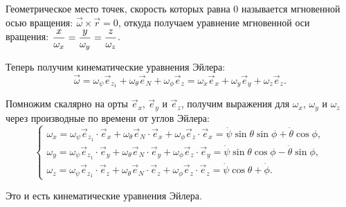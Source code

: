 Геометрическое место точек, скорость которых равна 0 называется мгновенной осью
вращения: \( \vec{\omega}\times\vec{r} = 0 \), откуда получаем уравнение
мгновенной оси вращения: \( \displaystyle \frac{x}{\omega_x} = \frac{y}{\omega_y} =
\frac{z}{\omega_z} \).

Теперь получим кинематические уравнения Эйлера:
\[
    \vec{\omega} = \omega_\psi\vec{e}_{z_1} + \omega_\theta\vec{e}_N +
    \omega_\phi\vec{e}_z = \omega_x\vec{e}_x + \omega_y\vec{e}_y +
    \omega_z\vec{e}_z.
\]

Помножим скалярно на орты \( \vec{e}_x \), \( \vec{e}_y \) и \( \vec{e}_z \),
получим выражения для \( \omega_x \), \( \omega_y \) и \( \omega_z \) через
производные по времени от углов Эйлера:
\[
    \left\{ \begin{array}{l}
        \omega_x = \omega_\psi\vec{e}_{z_1}\cdot\vec{e}_x +
        \omega_\theta\vec{e}_N\cdot\vec{e}_x +\omega_\phi\vec{e}_z\cdot\vec{e}_x
        = \dot{\psi}\sin\theta\sin\phi + \dot{\theta}\cos\phi, \\
        \omega_y = \omega_\psi\vec{e}_{z_1}\cdot\vec{e}_y +
        \omega_\theta\vec{e}_N\cdot\vec{e}_y +\omega_\phi\vec{e}_z\cdot\vec{e}_y
        = \dot{\psi}\sin\theta\cos\phi - \dot{\theta}\sin\phi, \\
        \omega_z = \omega_\psi\vec{e}_{z_1}\cdot\vec{e}_z +
        \omega_\theta\vec{e}_N\cdot\vec{e}_z +\omega_\phi\vec{e}_z\cdot\vec{e}_z
        = \dot{\psi}\cos\theta + \dot\phi.
    \end{array} \right.
\]

Это и есть кинематические уравнения Эйлера.
\newpage